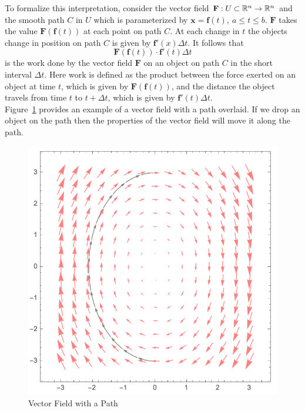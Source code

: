 \documentclass[12pt]{article}
\begin{document}
 To formalize this interpretation, consider the vector field $\mathbf{F}:U\subset\mathbb{R}^n\rightarrow\mathbb{R}^n$ and the smooth path $C$ in $U$ which is parameterized by $\mathbf{x}=\mathbf{f}(t),\ a\leq t\leq b$. $\mathbf{F}$ takes the value $\mathbf{F}(\mathbf{f}(t))$ at each point on path $C$. At each change in $t$ the objects change in position on path $C$ is given by $\mathbf{f}'(x)\Delta t$. It follows that 
\[
\mathbf{F}(\mathbf{f}(t)) \cdot \mathbf{f}'(t)\Delta t
\]
is the work done by the vector field $\mathbf{F}$ on an object on path $C$ in the short interval $\Delta t$. Here work is defined as the product between the force exerted on an object at time $t$, which is given by $\mathbf{F}(\mathbf{f}(t))$, and the distance the object travels from time $t$ to $t+\Delta t$, which is given by $\mathbf{f}'(t)\Delta t$.\\

 Figure~\ref{fig:vectorfieldexample2} provides an example of a vector field with a path overlaid. If we drop an object on the path then the properties of the vector field will move it along the path. \\

\begin{figure}[h]
\centering
\caption{Vector Field with a Path}
\label{fig:vectorfieldexample2}
\indent\includegraphics[scale=0.7]{vector_field_example2.png}
\end{figure}
\end{document}
